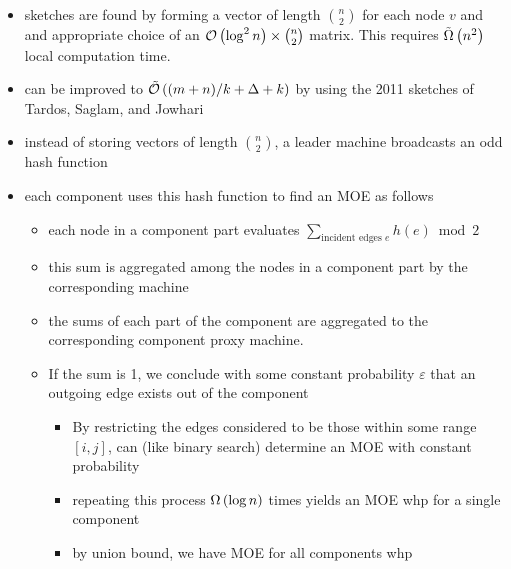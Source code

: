 \begin{frame}
    \begin{itemize}
        \item sketches are found by forming a vector of length
              $\binom{n}{2}$ for each node $v$ and and appropriate choice of an
              $\mathcal{O}\left(\log^2{n}\right) \times \binom{n}{2}$ matrix. This requires $\tilde{\Omega}\left(n^2\right)$ local computation time.
        \item can be improved to $\tilde{\mathcal{O}}\left((m+n) / k + \Delta + k\right)$ by using the
              2011 sketches of Tardos, Saglam, and Jowhari
        \item instead of storing vectors of length $\binom{n}{2}$, a leader machine broadcasts an \alert{odd hash function}
    \end{itemize}
\end{frame}
\begin{frame}
    \begin{itemize}
        \item each component uses this hash function to find an MOE as follows
              \begin{itemize}
                  \item each node in a component part evaluates $\sum_{\text{incident edges } e} h(e)
                            \bmod{2}$
                  \item this sum is aggregated among the nodes in a component part by the
                        corresponding machine
                  \item the sums of each part of the component are aggregated to the
                        corresponding component proxy machine.
                  \item If the sum is 1, we conclude with some constant probability
                        $\varepsilon$ that an outgoing edge exists out of the component
                        \begin{itemize}
                            \item By restricting the edges considered to be those within some range $[i, j]$, can (like binary search) determine an MOE with constant probability
                            \item repeating this process $\Omega\left(\log{n}\right)$ times yields an
                                  MOE whp for a single component
                            \item by union bound, we have MOE for all components whp
                        \end{itemize}
              \end{itemize}
    \end{itemize}
\end{frame}
